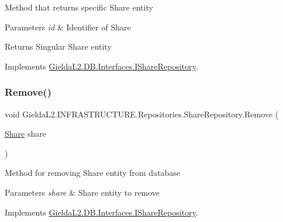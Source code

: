 Method that returns specific Share entity 


\begin{DoxyParams}{Parameters}
{\em id} & Identifier of Share\\
\hline
\end{DoxyParams}
\begin{DoxyReturn}{Returns}
Singular Share entity
\end{DoxyReturn}


Implements \mbox{\hyperlink{interface_gielda_l2_1_1_d_b_1_1_interfaces_1_1_i_share_repository_af252fb27ec646e120265e2f71c83677a}{Gielda\+L2.\+D\+B.\+Interfaces.\+I\+Share\+Repository}}.

\mbox{\label{class_gielda_l2_1_1_i_n_f_r_a_s_t_r_u_c_t_u_r_e_1_1_repositories_1_1_share_repository_a76ee0cf8f78b19983167a3bcdff4e405}} 
\subsubsection{\texorpdfstring{Remove()}{Remove()}}
{\footnotesize\ttfamily void Gielda\+L2.\+I\+N\+F\+R\+A\+S\+T\+R\+U\+C\+T\+U\+R\+E.\+Repositories.\+Share\+Repository.\+Remove (\begin{DoxyParamCaption}\item[{\mbox{\hyperlink{class_gielda_l2_1_1_d_b_1_1_entities_1_1_share}{Share}}}]{share }\end{DoxyParamCaption})}



Method for removing Share entity from database 


\begin{DoxyParams}{Parameters}
{\em share} & Share entity to remove\\
\hline
\end{DoxyParams}


Implements \mbox{\hyperlink{interface_gielda_l2_1_1_d_b_1_1_interfaces_1_1_i_share_repository_a270dc411526d961bac26e1df19ae2563}{Gielda\+L2.\+D\+B.\+Interfaces.\+I\+Share\+Repository}}.

\mbox{\label{class_gielda_l2_1_1_i_n_f_r_a_s_t_r_u_c_t_u_r_e_1_1_repositories_1_1_share_repository_a6843f1b6e31ecc35b15c6b677ed098a9}} 
